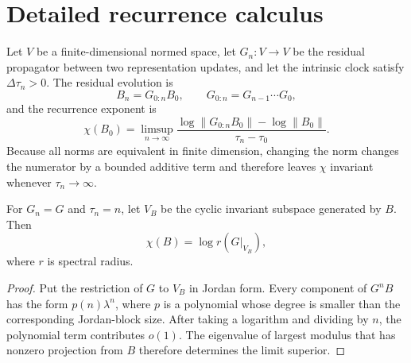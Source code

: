 \documentclass[11pt,a4paper]{article}
\begin{document}
\section{Detailed recurrence calculus}
Let $V$ be a finite-dimensional normed space, let $G_n:V\to V$ be the residual propagator between two representation updates, and let the intrinsic clock satisfy $\Delta\tau_n>0$. The residual evolution is
\begin{equation}
B_n=G_{0:n}B_0,\qquad G_{0:n}=G_{n-1}\cdots G_0,
\end{equation}
and the recurrence exponent is
\begin{equation}
\chi(B_0)=\limsup_{n\to\infty}
\frac{\log\|G_{0:n}B_0\|-\log\|B_0\|}{\tau_n-\tau_0}.
\end{equation}
Because all norms are equivalent in finite dimension, changing the norm changes the numerator by a bounded additive term and therefore leaves $\chi$ invariant whenever $\tau_n\to\infty$.

\begin{theorem}
For $G_n=G$ and $\tau_n=n$, let $V_{B}$ be the cyclic invariant subspace generated by $B$. Then
\begin{equation}
\chi(B)=\log r(G|_{V_B}),
\end{equation}
where $r$ is spectral radius.
\end{theorem}
\begin{proof}
Put the restriction of $G$ to $V_B$ in Jordan form. Every component of $G^nB$ has the form $p(n)\lambda^n$, where $p$ is a polynomial whose degree is smaller than the corresponding Jordan-block size. After taking a logarithm and dividing by $n$, the polynomial term contributes $o(1)$. The eigenvalue of largest modulus that has nonzero projection from $B$ therefore determines the limit superior.
\end{proof}
\end{document}
